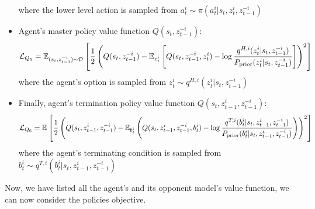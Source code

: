 \begin{itemize}
\begin{equation}
    \end{equation}
    where the lower level action is sampled from $a^i_t \sim \pi(a^i_t | s_t, z^i_t, z^{-i}_{t-1})$
    \item Agent's master policy value function $Q(s_t,  z^{-i}_{t-1})$:
    \begin{equation}
        \mathcal{L}_{Q_5} = \mathbb{E}_{(s_t,  z^{-i}_{t-1})\sim \mathcal{D}}\left[ \frac{1}{2}\left( Q(s_t,  z^{-i}_{t-1}) - \mathbb{E}_{z^i_t}\left[ Q(s_t,  z^{-i}_{t-1}, z^i_t) - \log\frac{q^{H, i}(z_t^i | s_t, z^{-i}_{t-1})}{P_{\text{prior}}(z_t^i | s_t, z^{-i}_{t-1})} \right] \right)^2 \right]
    \end{equation}
    where the agent's option is sampled from $z_t^i \sim q^{H, i}(z_t^i | s_t, z^{-i}_{t-1})$
    \item Finally, agent's termination policy value function $Q(s_t, z^i_{t-1}, z^{-i}_{t-1})$:
    \begin{equation}
        \mathcal{L}_{Q_6} = \mathbb{E}_{}\left[ \frac{1}{2}\left( Q(s_t, z^i_{t-1}, z^{-i}_{t-1}) - \mathbb{E}_{b^i_t}\left( Q(s_t, z^i_{t-1}, z^{-i}_{t-1}, b^i_t) - \log \frac{q^{T, i}(b^i_t | s_t, z^i_{t-1}, z^{-i}_{t-1})}{P_{\text{prior}}(b^i_t | s_t, z^i_{t-1}, z^{-i}_{t-1})} \right) \right)^2 \right]
    \end{equation}
    where the agent's terminating condition is sampled from $b^i_t \sim q^{T, i}(b^i_t | s_t, z^i_{t-1}, z^{-i}_{t-1})$
\end{itemize}
Now, we have listed all the agent's and its opponent model's value function, we can now consider the policies objective. 

